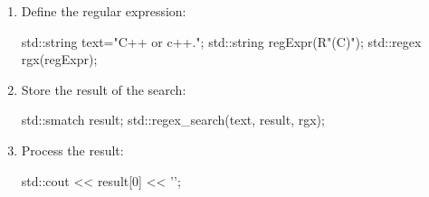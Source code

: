 \begin{enumerate}[label=\Roman*.]
\item 
Define the regular expression:

\begin{cpp}
std::string text="C++ or c++.";
std::string regExpr(R"(C\+\+)");
std::regex rgx(regExpr);
\end{cpp}

\item 
Store the result of the search:

\begin{cpp}
std::smatch result;
std::regex_search(text, result, rgx);
\end{cpp}

\item 
Process the result:

\begin{cpp}
std::cout << result[0] << '\n';
\end{cpp}

\end{enumerate}















